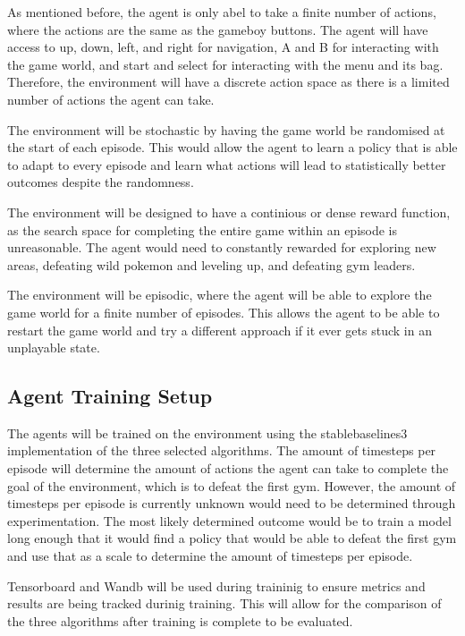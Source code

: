 As mentioned before, the agent is only abel to take a finite number of actions, where the actions are the same as the gameboy buttons. The agent will have access to up, down, left, and right for navigation, A and B for interacting with the game world, and start and select for interacting with the menu and its bag. Therefore, the environment will have a discrete action space as there is a limited number of actions the agent can take. 

The environment will be stochastic by having the game world be randomised at the start of each episode. This would allow the agent to learn a policy that is able to adapt to every episode and learn what actions will lead to statistically better outcomes despite the randomness.

The environment will be designed to have a continious or dense reward function, as the search space for completing the entire game within an episode is unreasonable. The agent would need to constantly rewarded for exploring new areas, defeating wild pokemon and leveling up, and defeating gym leaders. 

The environment will be episodic, where the agent will be able to explore the game world for a finite number of episodes. This allows the agent to be able to restart the game world and try a different approach if it ever gets stuck in an unplayable state.

\subsection{Agent Training Setup}

The agents will be trained on the environment using the stablebaselines3 implementation of the three selected algorithms. The amount of timesteps per episode will determine the amount of actions the agent can take to complete the goal of the environment, which is to defeat the first gym. However, the amount of timesteps per episode is currently unknown would need to be determined through experimentation. The most likely determined outcome would be to train a model long enough that it would find a policy that would be able to defeat the first gym and use that as a scale to determine the amount of timesteps per episode. 

Tensorboard and Wandb will be used during traininig to ensure metrics and results are being tracked durinig training. This will allow for the comparison of the three algorithms after training is complete to be evaluated. 

